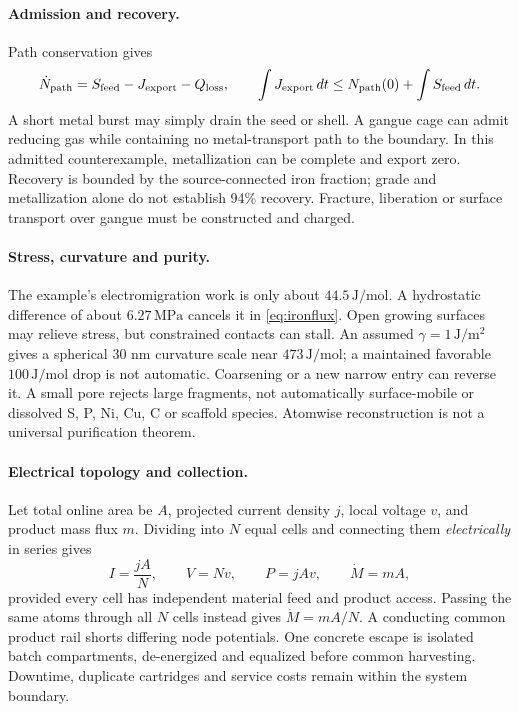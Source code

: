 \documentclass[11pt]{article}
\begin{document}
\paragraph{Admission and recovery.}
Path conservation gives
\[
 \dot N_{\rm path}=S_{\rm feed}-J_{\rm export}-Q_{\rm loss},\qquad
 \int J_{\rm export}\,dt\le N_{\rm path}(0)+\int S_{\rm feed}\,dt.
\]
A short metal burst may simply drain the seed or shell. A gangue cage can admit
reducing gas while containing no metal-transport path to the boundary. In this
admitted counterexample, metallization can be complete and export zero.
Recovery is bounded by the source-connected iron fraction; grade and
metallization alone do not establish 94\% recovery. Fracture, liberation or
surface transport over gangue must be constructed and charged.

\paragraph{Stress, curvature and purity.}
The example's electromigration work is only about $44.5\,\mathrm{J/mol}$.
A hydrostatic difference of about $6.27\,\mathrm{MPa}$ cancels it in
\eqref{eq:ironflux}. Open growing surfaces may relieve stress, but constrained
contacts can stall. An assumed $\gamma=1\,\mathrm{J/m^2}$ gives a spherical
30 nm curvature scale near $473\,\mathrm{J/mol}$; a maintained favorable
$100\,\mathrm{J/mol}$ drop is not automatic. Coarsening or a new narrow entry
can reverse it. A small pore rejects large fragments, not automatically
surface-mobile or dissolved S, P, Ni, Cu, C or scaffold species. Atomwise
reconstruction is not a universal purification theorem.

\paragraph{Electrical topology and collection.}
Let total online area be $A$, projected current density $j$, local voltage $v$,
and product mass flux $m$. Dividing into $N$ equal cells and connecting them
\emph{electrically} in series gives
\[
 I=\frac{jA}{N},\qquad V=Nv,\qquad P=jAv,\qquad \dot M=mA,
\]
provided every cell has independent material feed and product access. Passing
the same atoms through all $N$ cells instead gives $\dot M=mA/N$.
A conducting common product rail shorts differing node potentials.
One concrete escape is isolated batch compartments, de-energized and equalized
before common harvesting. Downtime, duplicate cartridges and service costs
remain within the system boundary.
\end{document}
